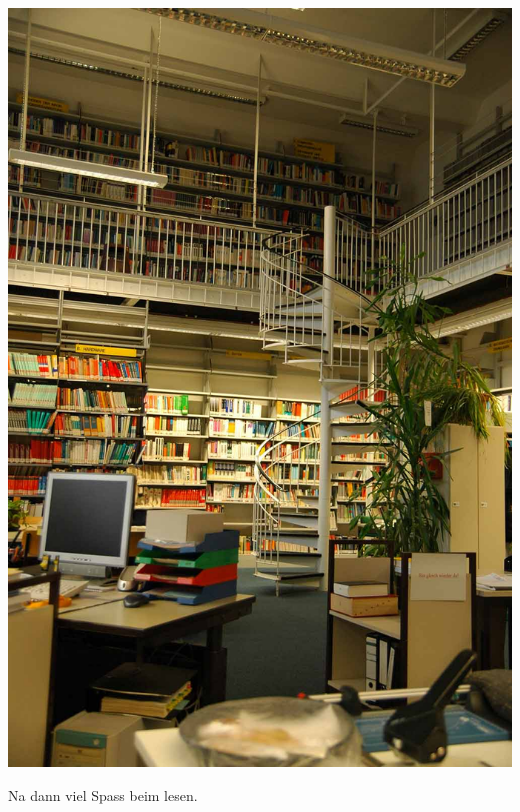 \begin{center}
\includegraphics[width=0.8\linewidth]{bilder/bib.jpg}
\end{center}

Na dann viel Spass beim lesen.
\spaltenende
